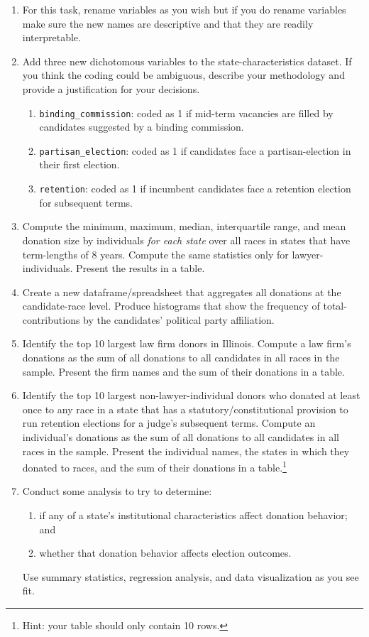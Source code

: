 \documentclass[11pt, letterpaper, twoside]{article}
\begin{document}
\begin{enumerate}
    \item For this task, rename variables as you wish but if you do rename variables make sure the new names are descriptive and that they are readily interpretable. 
    \item Add three new dichotomous variables to the state-characteristics dataset. If you think the coding could be ambiguous, describe your methodology and provide a justification for your decisions.
    \begin{enumerate}[label=\alph*.]
        \item \verb|binding_commission|: coded as 1 if mid-term vacancies are filled by candidates suggested by a binding commission.
        \item \verb|partisan_election|: coded as 1 if candidates face a partisan-election in their first election. 
        \item \verb|retention|: coded as 1 if incumbent candidates face a retention election for subsequent terms.
    \end{enumerate}
    \item Compute the minimum, maximum, median, interquartile range, and mean donation size by individuals \textit{for each state} over all races in states that have term-lengths of 8 years. Compute the same statistics only for lawyer-individuals. Present the results in a table. 
    \item Create a new dataframe/spreadsheet that aggregates all donations at the candidate-race level. Produce histograms that show the frequency of total-contributions by the candidates' political party affiliation.
    \item Identify the top 10 largest law firm donors in Illinois. Compute a law firm's donations as the sum of all donations to all candidates in all races in the sample. Present the firm names and the sum of their donations in a table.
    \item Identify the top 10 largest non-lawyer-individual donors who donated at least once to any race in a state that has a statutory/constitutional provision to run retention elections for a judge's subsequent terms. Compute an individual's donations as the sum of all donations to all candidates in all races in the sample. Present the individual names, the states in which they donated to races, and the sum of their donations in a table.\footnote{Hint: your table should only contain 10 rows.} 
    \item Conduct some analysis to try to determine:
    \begin{enumerate}[label=\alph*.]
        \item if any of a state's institutional characteristics affect donation behavior; and 
        \item whether that donation behavior affects election outcomes.
    \end{enumerate}
    Use summary statistics, regression analysis, and data visualization as you see fit.
\end{enumerate}
\end{document}
